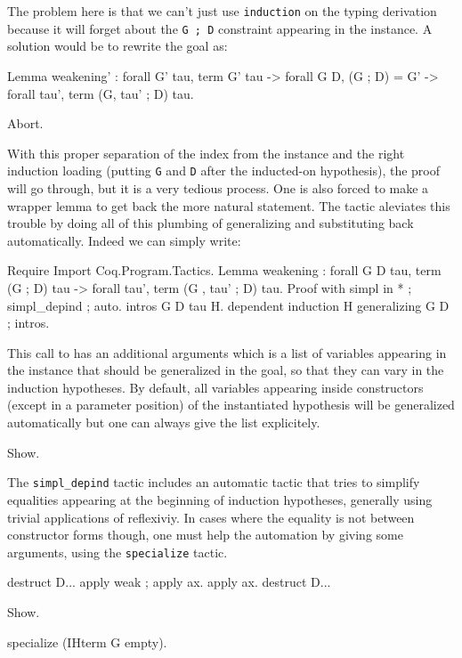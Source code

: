 \begin{coq_example*}
The problem here is that we can't just use {\tt induction} on the typing
derivation because it will forget about the {\tt G ; D} constraint
appearing in the instance. A solution would be to rewrite the goal as:
\begin{coq_example*}
Lemma weakening' : forall G' tau, term G' tau -> 
  forall G D, (G ; D) = G' ->
  forall tau', term (G, tau' ; D) tau.
\end{coq_example*}
\begin{coq_eval}
  Abort.
\end{coq_eval}

With this proper separation of the index from the instance and the right
induction loading (putting {\tt G} and {\tt D} after the inducted-on
hypothesis), the proof will go through, but it is a very tedious
process. One is also forced to make a wrapper lemma to get back the
more natural statement. The \depind tactic aleviates this trouble by
doing all of this plumbing of generalizing and substituting back automatically.
Indeed we can simply write:

\begin{coq_example*}
Require Import Coq.Program.Tactics.
Lemma weakening : forall G D tau, term (G ; D) tau -> 
  forall tau', term (G , tau' ; D) tau.
Proof with simpl in * ; simpl_depind ; auto.
  intros G D tau H. dependent induction H generalizing G D ; intros.
\end{coq_example*}

This call to \depind has an additional arguments which is a list of
variables appearing in the instance that should be generalized in the
goal, so that they can vary in the induction hypotheses. By default, all
variables appearing inside constructors (except in a parameter position)
of the instantiated hypothesis will be generalized automatically but
one can always give the list explicitely.

\begin{coq_example}
  Show.
\end{coq_example}

The {\tt simpl\_depind} tactic includes an automatic tactic that tries
to simplify equalities appearing at the beginning of induction
hypotheses, generally using trivial applications of
reflexiviy. In cases where the equality is not between constructor
forms though, one must help the automation by giving
some arguments, using the {\tt specialize} tactic.

\begin{coq_example*}
destruct D... apply weak ; apply ax. apply ax.
destruct D...
\end{coq_example*}
\begin{coq_example}
Show.
\end{coq_example}
\begin{coq_example}
  specialize (IHterm G empty).
\end{coq_example}


\end{coq_example*}
